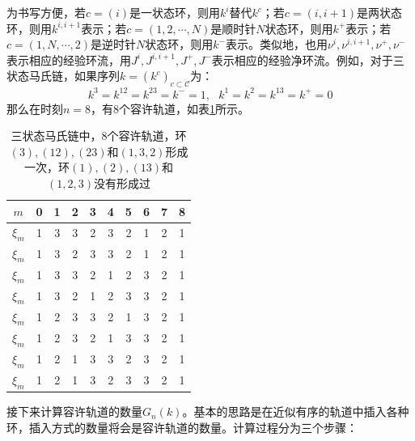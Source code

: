 为书写方便，若$c=(i)$是一状态环，则用$k^i$替代$k^c$；若$c=(i,i+1)$是两状态环，则用$k^{i,i+1}$表示；若$c=(1,2,\cdots,N)$是顺时针$N$状态环，则用$k^{+}$表示；若$c=(1,N,\cdots,2)$是逆时针$N$状态环，则用$k^{-}$表示。类似地，也用$\nu^i, \nu^{i,i+1}, \nu^+, \nu^-$表示相应的经验环流，用$J^i, J^{i, i+1}, J^{+}, J^{-}$表示相应的经验净环流。例如，对于三状态马氏链，如果序列$k=(k^c)_{c\subset \mathcal{C}}$为：
\begin{equation} \label{trajectory_ex}
    k^3 = k^{12} = k^{23} = k^- = 1, ~~~ k^1 = k^2 = k^{13} = k^+= 0
\end{equation}
那么在时刻$n=8$，有8个容许轨道，如表\ref{table:all possible trajectories}所示。

\begin{table}[htb!]
    \renewcommand\arraystretch{1.2}
    \begin{tabular}{cccccccccc}
    \hline
   $m$   & 0 & 1 & 2 & 3 & 4 & 5 & 6 & 7 & 8 \\\hline
   $\xi_m$& 1 & 3 & 3 & 2 & 3 & 2 & 1 & 2 & 1 \\\hline
   $\xi_m$& 1 & 3 & 2 & 3 & 3 & 2 & 1 & 2 & 1 \\\hline
   $\xi_m$& 1 & 3 & 3 & 2 & 1 & 2 & 3 & 2 & 1 \\\hline
   $\xi_m$& 1 & 3 & 2 & 1 & 2 & 3 & 3 & 2 & 1 \\\hline
   $\xi_m$& 1 & 2 & 3 & 3 & 2 & 1 & 3 & 2 & 1 \\\hline
   $\xi_m$& 1 & 2 & 3 & 2 & 1 & 3 & 3 & 2 & 1 \\\hline
   $\xi_m$& 1 & 2 & 1 & 3 & 3 & 2 & 3 & 2 & 1 \\\hline
   $\xi_m$& 1 & 2 & 1 & 3 & 2 & 3 & 3 & 2 & 1 \\\hline
    \end{tabular}\centering
    \caption{三状态马氏链中，8个容许轨道，环$(3), (12), (23)$和$(1,3,2)$形成一次，环$(1), (2), (13)$和$(1,2,3)$没有形成过}
    \label{table:all possible trajectories}
\end{table}

接下来计算容许轨道的数量$G_n(k)$。基本的思路是在近似有序的轨道中插入各种环，插入方式的数量将会是容许轨道的数量。计算过程分为三个步骤：

